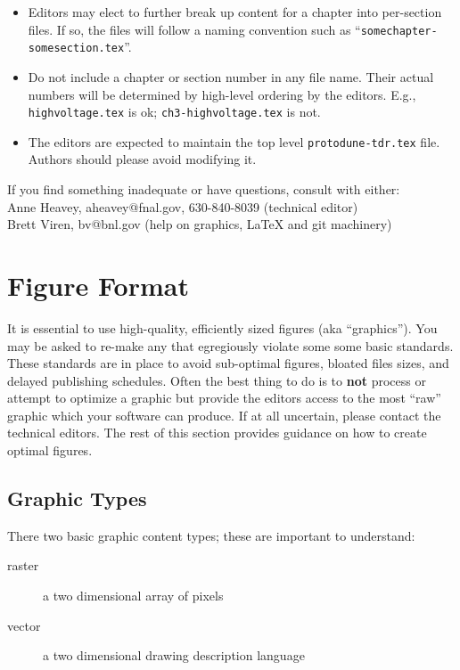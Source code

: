 \begin{itemize}
\item Editors may elect to further break up content for a chapter into per-section
  files.
  If so, the files will follow a naming convention such as
  ``\texttt{somechapter-somesection.tex}''.
\item Do not include a chapter or section number in any file
  name.
  Their actual numbers will be determined by high-level ordering by
  the editors.  E.g., \verb|highvoltage.tex| is ok; \verb|ch3-highvoltage.tex| is not.
\item The editors are expected to maintain the top level
  \texttt{protodune-tdr.tex} file.  Authors should please avoid modifying it.
\end{itemize}
If you find something inadequate or have questions, consult with either: \\
  Anne Heavey, aheavey@fnal.gov, 630-840-8039 (technical editor)\\
  Brett Viren, bv@bnl.gov (help on graphics, \LaTeX{} and git machinery)





\section{Figure Format}
\label{sec:figure-format}

It is essential to use high-quality, efficiently sized figures (aka
``graphics'').
You may be asked to re-make any that egregiously violate some some
basic standards.
These standards are in place to avoid sub-optimal figures, bloated
files sizes, and delayed publishing schedules.  
Often the best thing to do is to \textbf{not} process or attempt to
optimize a graphic but provide the editors access to the most ``raw''
graphic which your software can produce.
If at all uncertain, please contact the technical editors.
The rest of this section provides guidance on how to create optimal
figures.

\subsection{Graphic Types}
\label{sec:graphic-types}

There two basic graphic content types; these are important to understand:

\begin{description}
\item[raster] a two dimensional array of pixels
\item[vector] a two dimensional drawing description language
\end{description}


